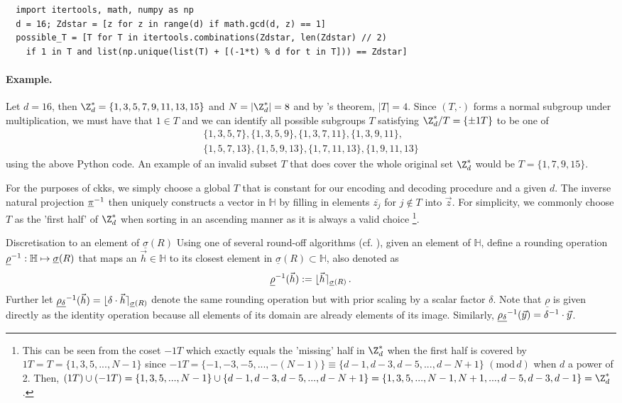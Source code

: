 \begin{verbatim}
  import itertools, math, numpy as np
  d = 16; Zdstar = [z for z in range(d) if math.gcd(d, z) == 1]
  possible_T = [T for T in itertools.combinations(Zdstar, len(Zdstar) // 2)
    if 1 in T and list(np.unique(list(T) + [(-1*t) % d for t in T])) == Zdstar]
\end{verbatim}

\paragraph{Example.}
Let $d = 16$, then $\Z_d^* = \{1, 3, 5, 7, 9, 11, 13, 15\}$ and $N = |\Z_d^*| = 8$ and by 's theorem, $|T| = 4$.
Since $(T, \cdot)$ forms a normal subgroup under multiplication, we must have that $1 \in T$ and we can identify all possible subgroups $T$ satisfying $\Z_d^* / T = \{\pm 1T\}$ to be one of
\begin{align*}
  \{1, 3, 5, 7\},
  \{1, 3, 5, 9\},
  \{1, 3, 7, 11\},
  \{1, 3, 9, 11\}, \\
  \{1, 5, 7, 13\},
  \{1, 5, 9, 13\},
  \{1, 7, 11, 13\},
  \{1, 9, 11, 13\}
\end{align*}
using the above Python code. An example of an invalid subset $T$ that does cover the whole original set $\Z_d^*$ would be $T = \{1, 7, 9, 15\}$.

For the purposes of \gls{ckks}, we simply choose a global $T$ that is constant for our encoding and decoding procedure and a given $d$.
The inverse natural projection $\underline{\pi}^{-1}$ then uniquely constructs a vector in $\mathbb{H}$ by filling in elements $\overline{z_j}$ for $j \notin T$ into $\vec{z}$.
For simplicity, we commonly choose $T$ as the 'first half' of $\Z_d^*$ when sorting in an ascending manner as it is always a valid choice
\footnote{
  This can be seen from the coset $-1T$ which exactly equals the 'missing' half in $\Z_d^*$ when the first half is covered by $1T = T = \{1, 3, 5, ..., N-1\}$ since $-1T = \{-1, -3, -5, ..., -(N-1)\} \equiv \{d-1, d-3, d-5, ..., d-N+1\}$ $(\text{mod}\, d)$ when $d$ a power of 2.
  Then, $(1T) \cup (-1T) = \{1, 3, 5, ..., N-1\} \cup \{d-1, d-3, d-5, ..., d-N+1\} = \{1, 3, 5, ..., N-1, N+1, ..., d-5, d-3, d-1\} = \Z_d^*$.
}.

\begin{definition}{Discretisation to an element of $\underline{\sigma}(R)$}{}
  Using one of several round-off algorithms (cf. \cite{2013-rlwe-toolkit}), given an element of $\mathbb{H}$, define a rounding operation $\underline{\rho}^{-1}: \mathbb{H} \mapsto \underline{\sigma}(R)$ that maps an $\vec{h} \in \mathbb{H}$ to its closest element in $\underline{\sigma}(R) \subset \mathbb{H}$, also denoted as
  $$\underline{\rho}^{-1}(\vec{h}) := \lfloor \vec{h} \rceil_{\underline{\sigma}(R)}\,.$$
  Further let $\underline{\rho_\delta}^{-1}(\vec{h}) = \lfloor \delta \cdot \vec{h} \rceil_{\underline{\sigma}(R)}$ denote the same rounding operation but with prior scaling by a scalar factor $\delta$.
  Note that $\underline{\rho}$ is given directly as the identity operation because all elements of its domain are already elements of its image. Similarly, $\underline{\rho_\delta}^{-1}(\vec{y}) = \delta^{-1} \cdot \vec{y}$.
\end{definition}

